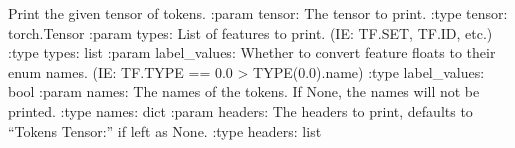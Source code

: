 \documentclass[letterpaper,10pt,english]{sphinxmanual}
\begin{document}
\begin{fulllineitems}
\begin{fulllineitems}
\label{\detokenize{nodes:nodes.nodePrinter.nodePrinter.print_tk_tensor}}
\pysigstartsignatures
\pysiglinewithargsret
{}
{\sphinxparamcomma {}\sphinxparamcomma {}\sphinxparamcomma {}\sphinxparamcomma {}}
{}
\pysigstopsignatures
\sphinxAtStartPar
Print the given tensor of tokens.
:param tensor: The tensor to print.
:type tensor: torch.Tensor
:param types: List of features to print. (IE: TF.SET, TF.ID, etc.)
:type types: list
:param label\_values: Whether to convert feature floats to their enum names. (IE: TF.TYPE == 0.0 \sphinxhyphen{}\textgreater{} TYPE(0.0).name)
:type label\_values: bool
:param names: The names of the tokens. If None, the names will not be printed.
:type names: dict
:param headers: The headers to print, defaults to “Tokens Tensor:” if left as None.
:type headers: list

\end{fulllineitems}



\end{fulllineitems}
\end{document}
